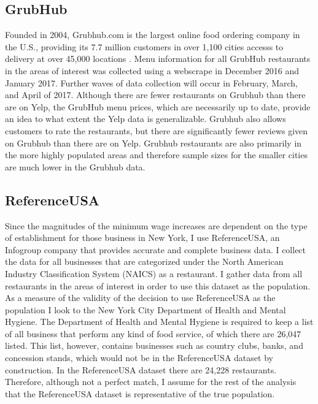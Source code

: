 \documentclass[11pt]{article}
\begin{document}
\subsection{GrubHub} 

Founded in 2004, Grubhub.com is the largest online food ordering company in the U.S., providing its 7.7 million customers in over 1,100 cities accesss to delivery at over 45,000 locations \cite{grubstat}. Menu information for all GrubHub restaurants in the areas of interest was collected using a webscrape in December 2016 and January 2017. Further waves of data collection will occur in February, March, and April of 2017. Although there are fewer restaurants on Grubhub than there are on Yelp, the GrubHub menu prices, which are necessarily up to date, provide an idea to what extent the Yelp data is generalizable. Grubhub also allows customers to rate the restaurants, but there are significantly fewer reviews given on Grubhub than there are on Yelp. Grubhub restaurants are also primarily in the more highly populated areas and therefore sample sizes for the smaller cities are much lower in the Grubhub data.


\subsection{ReferenceUSA}

Since the magnitudes of the minimum wage increases are dependent on the type of establishment for those business in New York, I use ReferenceUSA, an Infogroup company that provides accurate and complete business data. I collect the data for all businesses that are categorized under the North American Industry Classification System (NAICS) as a restaurant. I gather data from all restaurants in the areas of interest in order to use this dataset as the population. As a measure of the validity of the decision to use ReferenceUSA as the population I look to the New York City Department of Health and Mental Hygiene. The Department of Health and Mental Hygiene is required to keep a list of all business that perform any kind of food service, of which there are 26,047 listed. This list, however, contains businesses such as country clubs, banks, and concession stands, which would not be in the ReferenceUSA dataset by construction. In the ReferenceUSA dataset there are 24,228 restaurants. Therefore, although not a perfect match, I assume for the rest of the analysis that the ReferenceUSA dataset is representative of the true population.
\end{document}
